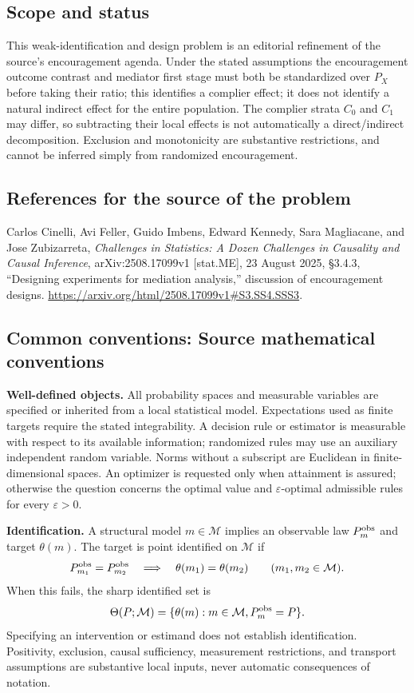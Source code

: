 \documentclass[11pt,a4paper]{article}
\begin{document}
\subsection*{Scope and status}
This weak-identification and design problem is an editorial refinement of the source's encouragement agenda. Under the stated assumptions the encouragement outcome contrast and mediator first stage must both be standardized over $P_X$ before taking their ratio; this identifies a complier effect; it does not identify a natural indirect effect for the entire population. The complier strata $C_0$ and $C_1$ may differ, so subtracting their local effects is not automatically a direct/indirect decomposition. Exclusion and monotonicity are substantive restrictions, and cannot be inferred simply from randomized encouragement.
\subsection*{References for the source of the problem}
Carlos Cinelli, Avi Feller, Guido Imbens, Edward Kennedy, Sara Magliacane, and Jose Zubizarreta, \emph{Challenges in Statistics: A Dozen Challenges in Causality and Causal Inference}, arXiv:2508.17099v1 [stat.ME], 23 August 2025, \S3.4.3, ``Designing experiments for mediation analysis,'' discussion of encouragement designs. \url{https://arxiv.org/html/2508.17099v1#S3.SS4.SSS3}.

\subsection*{Common conventions: Source mathematical conventions}

\textbf{Well-defined objects.}
All probability spaces and measurable variables are specified or inherited
from a local statistical model. Expectations used as finite targets require
the stated integrability. A decision rule or estimator is measurable with
respect to its available information; randomized rules may use an auxiliary
independent random variable. Norms without a subscript are Euclidean in
finite-dimensional spaces. An optimizer is requested only when attainment
is assured; otherwise the question concerns the optimal value and
$\varepsilon$-optimal admissible rules for every $\varepsilon>0$.

\textbf{Identification.}
A structural model $m\in\mathcal M$ implies an observable law
$P_m^{\rm obs}$ and target $\theta(m)$. The target is point identified on
$\mathcal M$ if
\[
 P_{m_1}^{\rm obs}=P_{m_2}^{\rm obs}
 \quad\Longrightarrow\quad\theta(m_1)=\theta(m_2)
 \qquad(m_1,m_2\in\mathcal M).
\]
When this fails, the sharp identified set is
\[
 \Theta(P;\mathcal M)=\{\theta(m):m\in\mathcal M,
                                  P_m^{\rm obs}=P\}.
\]
Specifying an intervention or estimand does not establish identification.
Positivity, exclusion, causal sufficiency, measurement restrictions, and
transport assumptions are substantive local inputs, never automatic
consequences of notation.
\end{document}
